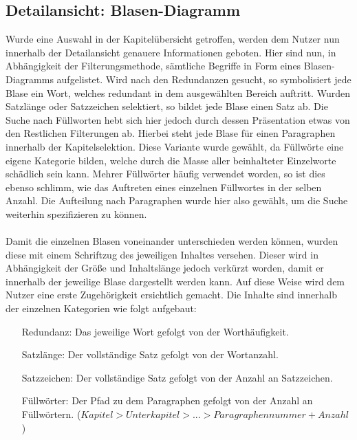 \subsection{Detailansicht: Blasen-Diagramm}
Wurde eine Auswahl in der Kapitel\"ubersicht getroffen, werden dem Nutzer nun innerhalb der Detailansicht genauere Informationen geboten. Hier sind nun, in Abh\"angigkeit der Filterungsmethode, s\"amtliche Begriffe in Form eines Blasen-Diagramms aufgelistet. Wird nach den Redundanzen gesucht, so symbolisiert jede Blase ein Wort, welches redundant in dem ausgew\"ahlten Bereich auftritt. Wurden Satzl\"ange oder Satzzeichen selektiert, so bildet jede Blase einen Satz ab. Die Suche nach F\"ullworten hebt sich hier jedoch durch dessen Pr\"asentation etwas von den Restlichen Filterungen ab. Hierbei steht jede Blase f\"ur einen Paragraphen innerhalb der Kapitelselektion. Diese Variante wurde gew\"ahlt, da F\"ullw\"orte eine eigene Kategorie bilden, welche durch die Masse aller beinhalteter Einzelworte sch\"adlich sein kann. Mehrer F\"ullw\"orter h\"aufig verwendet worden, so ist dies ebenso schlimm, wie das Auftreten eines einzelnen F\"ullwortes in der selben Anzahl. Die Aufteilung nach Paragraphen wurde hier also gew\"ahlt, um die Suche weiterhin spezifizieren zu k\"onnen.\\
\\
Damit die einzelnen Blasen voneinander unterschieden werden k\"onnen, wurden diese mit einem Schriftzug des jeweiligen Inhaltes versehen. Dieser wird in Abh\"angigkeit der Gr\"o{\ss}e und Inhaltsl\"ange jedoch verk\"urzt worden, damit er innerhalb der jeweilige Blase dargestellt werden kann. Auf diese Weise wird dem Nutzer eine erste Zugeh\"origkeit ersichtlich gemacht. Die Inhalte sind innerhalb der einzelnen Kategorien wie folgt aufgebaut: \\
\begin{center} 
   \begin{varwidth}{2in} 
      \begin{itemize} 
         \item[Redundanz:] Das jeweilige Wort gefolgt von der Worth\"aufigkeit. 
		 \item[Satzl\"ange:] Der vollst\"andige Satz gefolgt von der Wortanzahl.
		 \item[Satzzeichen:] Der vollst\"andige Satz gefolgt von der Anzahl an Satzzeichen.
		 \item[F\"ullw\"orter:] Der Pfad zu dem Paragraphen gefolgt von der Anzahl an F\"ullw\"ortern. (\(Kapitel  >  Unterkapitel  >  . . .  >  Paragraphennummer + Anzahl\))
      \end{itemize} 
   \end{varwidth} 
\end{center}
